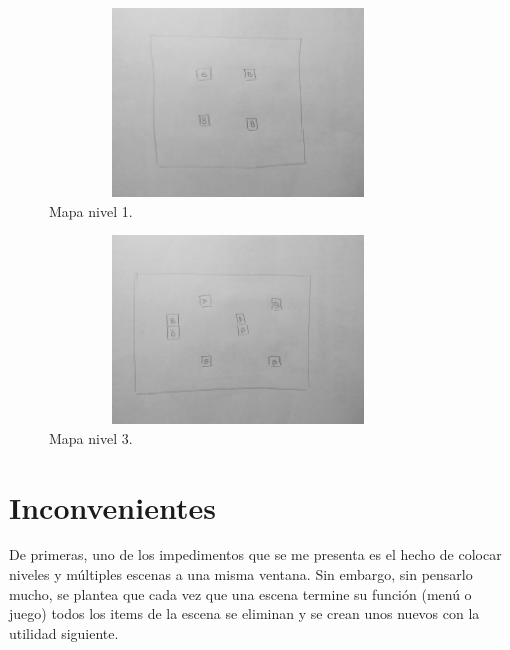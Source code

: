 \documentclass{article}
\begin{document}
\begin{figure}[h]
\includegraphics[width=10cm, height=5cm]{imagenes/mapa1.jpg}
\centering
\caption{Mapa nivel 1.}
\label{fig:diagram}
\end{figure}

\begin{figure}[h]
\includegraphics[width=10cm, height=5cm]{imagenes/mapa3.jpg}
\centering
\caption{Mapa nivel 3.}
\label{fig:diagram}
\end{figure}

\section{Inconvenientes}
De primeras, uno de los impedimentos que se me presenta es el hecho de colocar niveles y múltiples escenas a una misma ventana. Sin embargo, sin pensarlo mucho, se plantea que cada vez que una escena termine su función (menú o juego) todos los items de la escena se eliminan y se crean unos nuevos con la utilidad siguiente.
\end{document}
